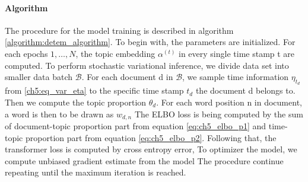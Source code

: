 \paragraph{Algorithm}The procedure for the model training is described in algorithm \ref{algorithm:detem_algorithm}. To begin with, the parameters are initialized.
For each epochs $ 1,\dots, N $, the topic embedding $ \alpha^{(t)} $ in every single time stamp t are computed. 
To perform stochastic variational inference, we divide data set into smaller data batch $ \mathcal{B} $.
For each document d in $ \mathcal{B} $, we sample time information $ \eta_{t_d} $ from \ref{ch5:eq_var_eta} to the specific time stamp $ t_d $ the document d belongs to.
Then we compute the topic proportion $ \theta_d $. For each word position n in document, a word is then to be drawn as $ w_{d,n} $
The ELBO loss is being computed by the sum of document-topic proportion part from equation \ref{eq:ch5_elbo_p1} and time-topic proportion part from equation \ref{eq:ch5_elbo_p2}.
Following that, the transformer loss is computed by cross entropy error, 
To optimizer the model, we compute unbiased gradient estimate from the model 
The procedure continue repeating until the maximum iteration is reached.